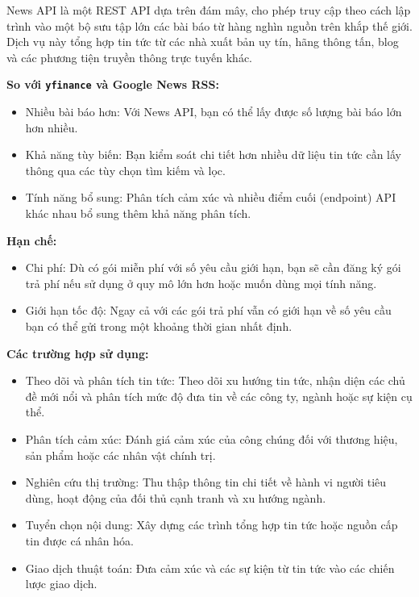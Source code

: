 News API là một REST API dựa trên đám mây, cho phép truy cập theo cách lập trình vào một bộ sưu tập lớn các bài báo từ hàng nghìn nguồn trên khắp thế giới. Dịch vụ này tổng hợp tin tức từ các nhà xuất bản uy tín, hãng thông tấn, blog và các phương tiện truyền thông trực tuyến khác.

\textbf{So với \texttt{yfinance} và Google News RSS:}

\begin{itemize}
\item
  Nhiều bài báo hơn: Với News API, bạn có thể lấy được số lượng bài báo lớn hơn nhiều.
\item
  Khả năng tùy biến: Bạn kiểm soát chi tiết hơn nhiều dữ liệu tin tức cần lấy thông qua các tùy chọn tìm kiếm và lọc.
\item
  Tính năng bổ sung: Phân tích cảm xúc và nhiều điểm cuối (endpoint) API khác nhau bổ sung thêm khả năng phân tích.
\end{itemize}

\textbf{Hạn chế:}

\begin{itemize}
\item
  Chi phí: Dù có gói miễn phí với số yêu cầu giới hạn, bạn sẽ cần đăng ký gói trả phí nếu sử dụng ở quy mô lớn hơn hoặc muốn dùng mọi tính năng.
\item
  Giới hạn tốc độ: Ngay cả với các gói trả phí vẫn có giới hạn về số yêu cầu bạn có thể gửi trong một khoảng thời gian nhất định.
\end{itemize}

\textbf{Các trường hợp sử dụng:}

\begin{itemize}
\item
  Theo dõi và phân tích tin tức: Theo dõi xu hướng tin tức, nhận diện các chủ đề mới nổi và phân tích mức độ đưa tin về các công ty, ngành hoặc sự kiện cụ thể.
\item
  Phân tích cảm xúc: Đánh giá cảm xúc của công chúng đối với thương hiệu, sản phẩm hoặc các nhân vật chính trị.
\item
  Nghiên cứu thị trường: Thu thập thông tin chi tiết về hành vi người tiêu dùng, hoạt động của đối thủ cạnh tranh và xu hướng ngành.
\item
  Tuyển chọn nội dung: Xây dựng các trình tổng hợp tin tức hoặc nguồn cấp tin được cá nhân hóa.
\item
  Giao dịch thuật toán: Đưa cảm xúc và các sự kiện từ tin tức vào các chiến lược giao dịch.
\end{itemize}

